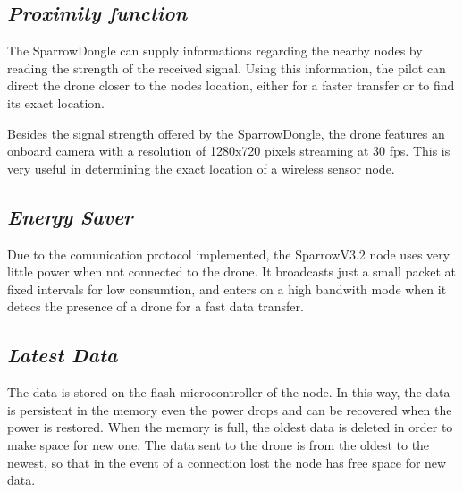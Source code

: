 \subsection{\textit{Proximity function}} 

\label{sec:prox}

The SparrowDongle can supply informations regarding the nearby nodes by reading the strength of the received signal. Using this information, the pilot can direct the drone closer to the nodes location, either for a faster transfer or to find its exact location. 

Besides the signal strength offered by the SparrowDongle, the drone features an onboard camera with a resolution of 1280x720 pixels streaming at 30 fps. This is very useful in determining the exact location of a wireless sensor node.


\subsection{\textit{Energy Saver}} 

\label{sec:eng}

Due to the comunication protocol implemented, the SparrowV3.2 node uses very little power when not connected to the drone. It broadcasts just a small packet at fixed intervals for low consumtion, and enters on a high bandwith mode when it detecs the presence of a drone for a fast data transfer. 


\subsection{\textit{Latest Data}} 

\label{sec:data}

The data is stored on the flash microcontroller of the node. In this way, the data is persistent in the memory even the power drops and can be recovered when the power is restored. When the memory is full, the oldest data is deleted in order to make space for new one. The data sent to the drone is from the oldest to the newest, so that in the event of a connection lost the node has free space for new data. 

 

 



